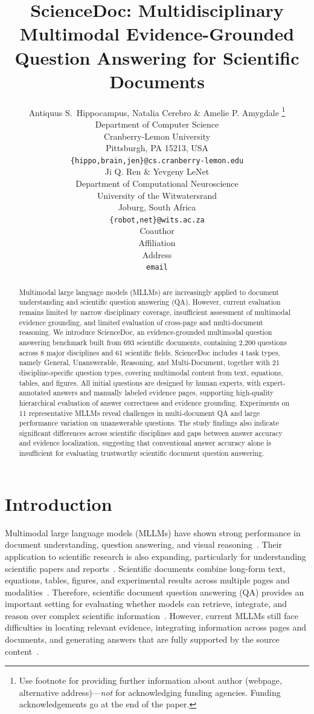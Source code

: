 \documentclass{article} %
\title{ScienceDoc: Multidisciplinary Multimodal Evidence-Grounded Question Answering for Scientific Documents}
\author{Antiquus S.~Hippocampus, Natalia Cerebro \& Amelie P. Amygdale \thanks{ Use footnote for providing further information
about author (webpage, alternative address)---\emph{not} for acknowledging
funding agencies.  Funding acknowledgements go at the end of the paper.} \\
Department of Computer Science\\
Cranberry-Lemon University\\
Pittsburgh, PA 15213, USA \\
\texttt{\{hippo,brain,jen\}@cs.cranberry-lemon.edu} \\
\And
Ji Q. Ren \& Yevgeny LeNet \\
Department of Computational Neuroscience \\
University of the Witwatersrand \\
Joburg, South Africa \\
\texttt{\{robot,net\}@wits.ac.za} \\
\AND
Coauthor \\
Affiliation \\
Address \\
\texttt{email}
}
\begin{document}
\maketitle

\begin{abstract}
Multimodal large language models (MLLMs) are increasingly applied to document understanding and scientific question answering (QA). However, current evaluation remains limited by narrow disciplinary coverage, insufficient assessment of multimodal evidence grounding, and limited evaluation of cross-page and multi-document reasoning. We introduce ScienceDoc, an evidence-grounded multimodal question answering benchmark built from 693 scientific documents, containing 2,200 questions across 8 major disciplines and 61 scientific fields. ScienceDoc includes 4 task types, namely General, Unanswerable, Reasoning, and Multi-Document, together with 21 discipline-specific question types, covering multimodal content from text, equations, tables, and figures. All initial questions are designed by human experts, with expert-annotated answers and manually labeled evidence pages, supporting high-quality hierarchical evaluation of answer correctness and evidence grounding. Experiments on 11 representative MLLMs reveal challenges in multi-document QA and large performance variation on unanswerable questions. The study findings also indicate significant differences across scientific disciplines and gaps between answer accuracy and evidence localization, suggesting that conventional answer accuracy alone is insufficient for evaluating trustworthy scientific document question answering.
\end{abstract}


\section{Introduction}

Multimodal large language models (MLLMs) have shown strong performance in document understanding, question answering, and visual reasoning~\citep{li2023blip,fan2024fusing,chen2024internvl,abdin2024phi,yao2025survey}.
Their application to scientific research is also expanding, particularly for understanding scientific papers and reports~\citep{li2024multimodal}. Scientific documents combine long-form text, equations, tables, figures, and experimental results across multiple pages and modalities~\citep{li2024m3sciqa}. Therefore, scientific document question answering (QA) provides an important setting for evaluating whether models can retrieve, integrate, and reason over complex scientific information~\citep{dasigi2021dataset,luo2023reasoning,zheng2024advancing,hannan2026docslm}. 
However, current MLLMs still face difficulties in locating relevant evidence, integrating information across pages and documents, and generating answers that are fully supported by the source content~\citep{dasigi2021dataset,li2024m3sciqa,deng2025longdocurl}.
\end{document}
